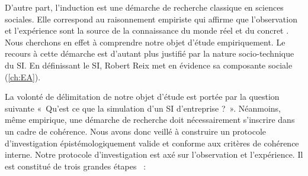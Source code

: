 	D'autre part, l'induction est une démarche de recherche classique en sciences 
sociales. Elle correspond au raisonnement empiriste qui affirme que 
l'observation et l'expérience sont la source de la connaissance du monde réel et 
du concret \cite{madeleine2001methodes}. Nous cherchons en effet à comprendre 
notre objet d'étude empiriquement. Le recours à cette démarche est d'autant plus 
justifié par la nature socio-technique du SI. En définissant le SI, Robert Reix 
met en évidence sa composante sociale (\ref{ch:EA}). 
	

	La volonté de délimitation de notre objet d'étude est portée par la question 
suivante «~Qu'est ce que la simulation d'un SI d'entreprise ?~». Néanmoins, même 
empirique, une démarche de recherche doit nécessairement s'inscrire dans un 
cadre de cohérence. Nous avons donc veillé à construire un protocole 
d'investigation épistémologiquement valide et conforme aux critères de cohérence 
interne. Notre protocole d'investigation est axé sur l'observation et 
l'expérience. Il est constitué de trois grandes étapes ~:
		
